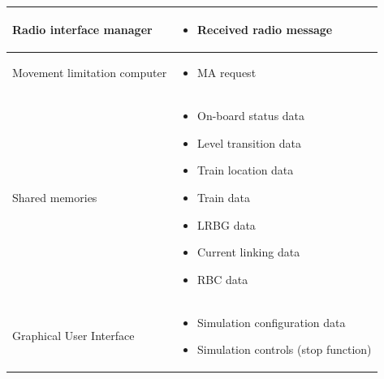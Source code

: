 \documentclass[nocc]{template/openetcs_report}
\begin{document}
\begin{longtable}{|l|l|}
				\hline	

					\begin{minipage}[t]{0.35\linewidth} Radio interface manager	\end{minipage} 
				&	\begin{minipage}[t]{0.65\linewidth}
						\begin{itemize}
							\item Received radio message
						\end{itemize}			
					\end{minipage} \\
				
				\hline	

					\begin{minipage}[t]{0.35\linewidth} Movement limitation computer	\end{minipage} 
				&	\begin{minipage}[t]{0.65\linewidth}
						\begin{itemize}
							\item MA request
						\end{itemize}			
					\end{minipage} \\
				
				\hline													
				
					\begin{minipage}[t]{0.35\linewidth} Shared memories	\end{minipage} 
				&	\begin{minipage}[t]{0.65\linewidth}
						\begin{itemize}
							\item On-board status data
							\item Level transition data
							\item Train location data
							\item Train data
							\item LRBG data
							\item Current linking data
							\item RBC data
						\end{itemize}				
					\end{minipage} \\
				\hline													
					\begin{minipage}[t]{0.35\linewidth} Graphical User Interface	\end{minipage} 
				&	\begin{minipage}[t]{0.65\linewidth}
						\begin{itemize}
							\item Simulation configuration data
							\item Simulation controls (stop function)
						\end{itemize}				
					\end{minipage} \\				
				\hline	
			\end{longtable}	
\end{document}
